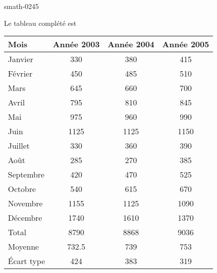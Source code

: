 
\begin{corrige}{smath-0245}

Le tableau complété est
\begin{center}
\begin{tabular}[c]{|l|c|c|c|}
    \hline
Mois& Année 2003& Année 2004& Année 2005\\
\hline\hline
Janvier& 330& 380& 415\\
\hline
Février& 450& 485& 510\\
\hline
Mars& 645& 660& 700\\
\hline
Avril& 795& 810& 845\\
\hline
Mai& 975& 960& 990\\
\hline
Juin& 1125& 1125& 1150\\
\hline
Juillet& 330& 360& 390\\
\hline
Août& 285& 270& 385\\
\hline
Septembre& 420& 470& 525\\
\hline
Octobre& 540& 615& 670\\
\hline
Novembre& 1155& 1125& 1090\\
\hline
Décembre& 1740& 1610& 1370\\
\hline\hline
Total& 8790 & 8868 & 9036 \\
 \hline\hline
Moyenne&732.5&739&753\\
\hline
Écart type&424&383&319\\
\hline
\end{tabular}
\end{center}
\end{corrige}
